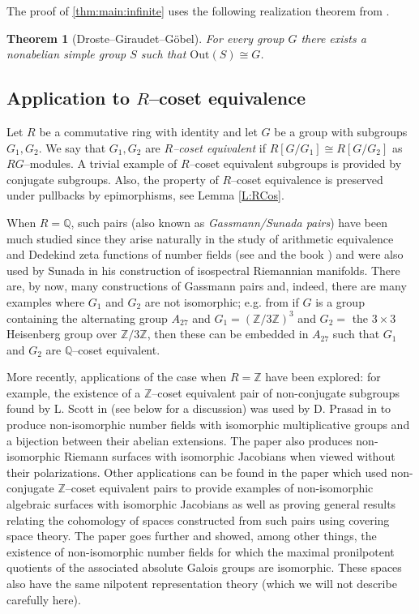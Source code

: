 \documentclass[11pt]{amsart}
\newtheorem{thm}{Theorem}[section]
\numberwithin{equation}{section}
\begin{document}
The proof of \cref{thm:main:infinite} uses the following realization theorem from \cite{DGG}.

\begin{thm}[Droste--Giraudet--G\"obel]\label{thm:DGG}
For every group $G$ there exists a nonabelian simple group $S$ such that
$\mathrm{Out}(S) \cong G$.
\end{thm}


\subsection{Application to $R$--coset equivalence}

Let $R$ be a commutative ring with identity and let $G$ be a group with subgroups $G_1,G_2$. We say that $G_1, G_2$ are {\em $R$--coset equivalent} if $R[G/G_1] \cong R[G/G_2]$ as $RG$--modules. A trivial example of $R$--coset equivalent subgroups is provided by conjugate subgroups. Also, the property of $R$--coset equivalence is preserved under pullbacks by epimorphisms, see Lemma \ref{L:RCos}.

When $R=\mathbb{Q}$, such pairs (also known as {\em Gassmann/Sunada pairs}) have been much studied since they arise naturally in the study of arithmetic equivalence and Dedekind zeta functions of number fields (see \cite{Perlis} and the book \cite{Klingen}) and were also used by Sunada \cite{Sunada} in his construction of isospectral Riemannian manifolds. There are, by now, many constructions of Gassmann pairs and, indeed,  there are many examples where $G_1$ and $G_2$ are not isomorphic; e.g. from \cite[Lemma 3.1]{Sp} if $G$ is a group containing the alternating group $A_{27}$ and $G_1 =(\mathbb{Z}/3\mathbb{Z})^3$ and $G_2 =$ the $3\times 3$ Heisenberg group over $\mathbb{Z}/3\mathbb{Z}$, then these can be embedded in $A_{27}$ such that $G_1$ and $G_2$ are $\mathbb{Q}$--coset equivalent.

More recently, applications of the case when $R=\mathbb{Z}$ have been explored: for example, the existence of a $\mathbb{Z}$--coset equivalent pair of non-conjugate subgroups found by L. Scott in \cite{Scott} (see below for a discussion) was used by D. Prasad in \cite{Prasad} to produce non-isomorphic number fields with isomorphic multiplicative groups and a bijection between their abelian extensions. The paper \cite{Prasad} also produces non-isomorphic Riemann surfaces with isomorphic Jacobians when viewed without their polarizations.  Other applications can be found in the paper \cite{AKMS} which used non-conjugate $\mathbb{Z}$--coset equivalent pairs to provide examples of non-isomorphic algebraic surfaces with isomorphic Jacobians as well as proving general results relating the cohomology of spaces constructed from such pairs using covering space theory. The paper \cite{GM} goes further and showed, among other things, the existence of non-isomorphic number fields for which the maximal pronilpotent quotients of the associated absolute Galois groups are isomorphic. These spaces also have the same nilpotent representation theory (which we will not describe carefully here).
\end{document}
